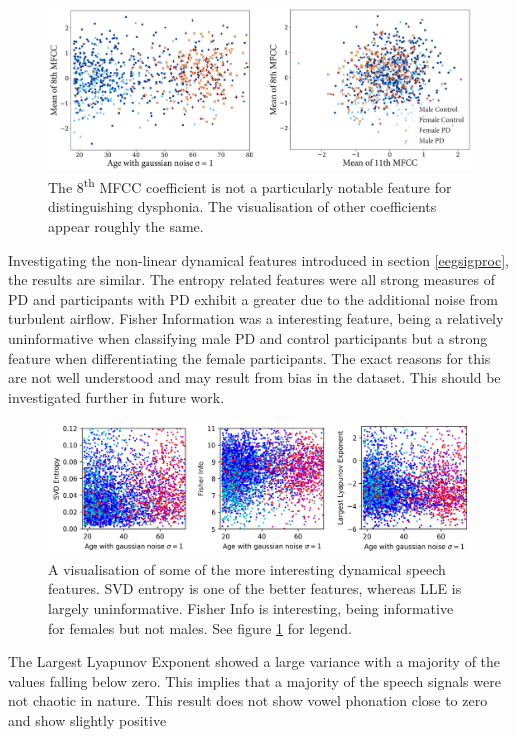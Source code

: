 \documentclass[12pt, twoside]{book}
\begin{document}
\begin{figure}[h]
	\caption{The 8\textsuperscript{th} MFCC coefficient is not a particularly notable feature for distinguishing dysphonia. The visualisation of other coefficients appear roughly the same. }
	\label{mfcc_feat}
	\centering\includegraphics[width=1\linewidth]{mfcc_feat.png}
\end{figure}


Investigating the non-linear dynamical features introduced in section \ref{eegsigproc}, the results are similar. The entropy related features were all strong measures of PD and participants with PD exhibit a greater due to the additional noise from turbulent airflow. Fisher Information was a interesting feature, being a relatively uninformative when classifying male PD and control participants but a strong feature when differentiating the female participants. The exact reasons for this are not well understood and may result from bias in the dataset. This should be investigated further in future work.


\begin{figure}[h]
	\caption{A visualisation of some of the more interesting dynamical speech features. SVD entropy is one of the better features, whereas LLE is largely uninformative. Fisher Info is interesting, being informative for females but not males. See figure \ref{mfcc_feat} for legend.}
	\label{speechdynamic}
	\centering\centerline{\includegraphics[width=1.1\linewidth]{speech_dynamic.png}}
\end{figure}

The Largest Lyapunov Exponent showed a large variance with a majority of the values falling below zero. This implies that a majority of the speech signals were not chaotic in nature. This result does not \cite{lyapunovzero, banbrook1999speechlyapunov} show vowel phonation close to zero and \cite{kokkinos2005nonlinearlyapunov,lyapunovpositive} show slightly positive
\end{document}
